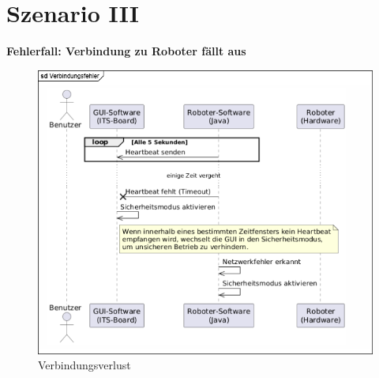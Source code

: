 \clearpage
\section{Szenario III}
\textbf{Fehlerfall: Verbindung zu Roboter fällt aus}\\

\begin{figure}[h]  
    \centering
    \includegraphics[width=0.8\linewidth]{diagrams/Verbindungsverlust.png}
    \caption{Verbindungsverlust}
    \label{fig:Verbindungsverlust}
\end{figure}



